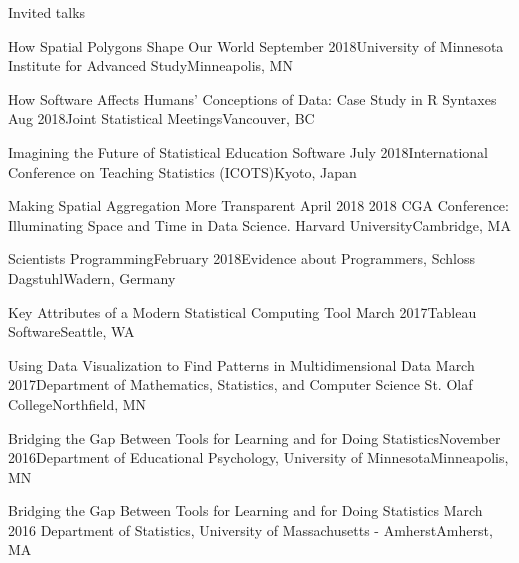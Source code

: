 \documentclass{resume} %
\begin{document}
\begin{rSection}{Invited talks}
\begin{sSubsection}{How Spatial Polygons Shape Our World}{ }{September 2018}{University of Minnesota Institute for Advanced Study}{Minneapolis, MN}
\end{sSubsection}

\begin{sSubsection}{How Software Affects Humans' Conceptions of Data: Case Study in R Syntaxes}{ }{Aug 2018}{Joint Statistical Meetings}{Vancouver, BC}
\end{sSubsection}

\begin{sSubsection}{Imagining the Future of Statistical Education Software}{ }{July 2018}{International Conference on Teaching Statistics (ICOTS)}{Kyoto, Japan}
\end{sSubsection}

\begin{sSubsection}{Making Spatial Aggregation More Transparent}{ }{April 2018}{ 2018 CGA Conference: Illuminating Space and Time in Data Science. Harvard University}{Cambridge, MA}
\end{sSubsection}

\begin{sSubsection}{Scientists Programming}{}{February 2018}{Evidence about Programmers, Schloss Dagstuhl}{Wadern, Germany}
\end{sSubsection}

\begin{sSubsection}{Key Attributes of a Modern Statistical Computing Tool}{ }{March 2017}{Tableau Software}{Seattle, WA}
\end{sSubsection}

\begin{sSubsection}{Using Data Visualization to Find Patterns in Multidimensional Data}{ }{March 2017}{Department of Mathematics, Statistics, and Computer Science St. Olaf College}{Northfield, MN}
\end{sSubsection}

\begin{sSubsection}{Bridging the Gap Between Tools for Learning and for Doing Statistics}{}{November 2016}{Department of Educational Psychology, University of Minnesota}{Minneapolis, MN}
\end{sSubsection}

\begin{sSubsection}{Bridging the Gap Between Tools for Learning and for Doing Statistics}{ }{March 2016 }{Department of Statistics, University of Massachusetts - Amherst}{Amherst, MA}
\end{sSubsection}


\end{rSection}
\end{document}
